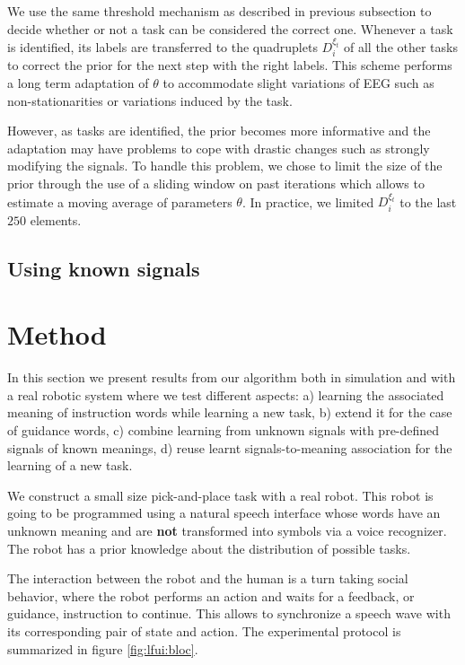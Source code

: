 We use the same threshold mechanism as described in previous subsection to decide whether or not a task can be considered the correct one. Whenever a task is identified, its labels are transferred to the quadruplets $D^{\xi_t}_{i}$ of all the other tasks to correct the prior for the next step with the right labels. This scheme performs a long term adaptation of $\theta$ to accommodate slight variations of EEG such as non-stationarities or variations induced by the task. 

However, as tasks are identified, the prior becomes more informative and the adaptation may have problems to cope with drastic changes such as strongly modifying the signals. To handle this problem, we chose to limit the size of the prior through the use of a sliding window on past iterations which allows to estimate a moving average of parameters $\theta$. In practice, we limited $D^{\xi_t}_{i}$ to the last $250$ elements.

\subsection{Using known signals}

\section{Method}

In this section we present results from our algorithm both in simulation and with a real robotic system where we test different aspects: a) learning the associated meaning of instruction words while learning a new task, b) extend it for the case of guidance words, c) combine learning from unknown signals with pre-defined signals of known meanings, d) reuse learnt signals-to-meaning association for the learning of a new task.

We construct a small size pick-and-place task with a real robot. This robot is going to be programmed using a natural speech interface whose words have an unknown meaning and are \textbf{not} transformed into symbols via a voice recognizer. The robot has a prior knowledge about the distribution of possible tasks.

The interaction between the robot and the human is a turn taking social behavior, where the robot performs an action and waits for a feedback, or guidance, instruction to continue. This allows to synchronize a speech wave with its corresponding pair of state and action. The experimental protocol is summarized in figure \ref{fig:lfui:bloc}.

